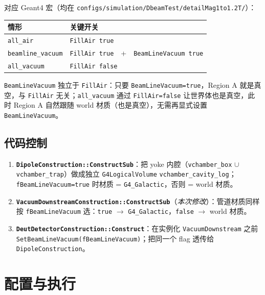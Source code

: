 \documentclass[a4paper, 11pt]{article}
\begin{document}
对应 Geant4 宏（均在 \verb|configs/simulation/DbeamTest/detailMag1to1.2T/|）：

\begin{center}
\begin{tabular}{ll}
\toprule
情形 & 关键开关 \\
\midrule
\texttt{all\_air}         & \verb|FillAir true| \\
\texttt{beamline\_vacuum} & \verb|FillAir true|\ \ +\ \ \verb|BeamLineVacuum true| \\
\texttt{all\_vacuum}      & \verb|FillAir false| \\
\bottomrule
\end{tabular}
\end{center}

\texttt{BeamLineVacuum} 独立于 \texttt{FillAir}：只要 \texttt{BeamLineVacuum=true}，Region A 就是真空，与 \texttt{FillAir} 无关；\texttt{all\_vacuum} 通过 \texttt{FillAir=false} 让世界体也是真空，此时 Region A 自然跟随 world 材质（也是真空），无需再显式设置 \texttt{BeamLineVacuum}。

\subsection{代码控制}

\begin{enumerate}[nosep]
  \item \textbf{\texttt{DipoleConstruction::ConstructSub}}：把 yoke 内腔（\texttt{vchamber\_box} $\cup$ \texttt{vchamber\_trap}）做成独立 \texttt{G4LogicalVolume} \texttt{vchamber\_cavity\_log}；\texttt{fBeamLineVacuum=true} 时材质 = \texttt{G4\_Galactic}，否则 = world 材质。
  \item \textbf{\texttt{VacuumDownstreamConstruction::ConstructSub}}（\emph{本次修改}）：管道材质同样按 \texttt{fBeamLineVacuum} 选：\texttt{true} $\to$ \texttt{G4\_Galactic}，\texttt{false} $\to$ world 材质。
  \item \textbf{\texttt{DeutDetectorConstruction::Construct}}：在实例化 \texttt{VacuumDownstream} 之前 \verb|SetBeamLineVacuum(fBeamLineVacuum)|；把同一个 flag 透传给 \texttt{DipoleConstruction}。
\end{enumerate}

\section{配置与执行}
\end{document}
